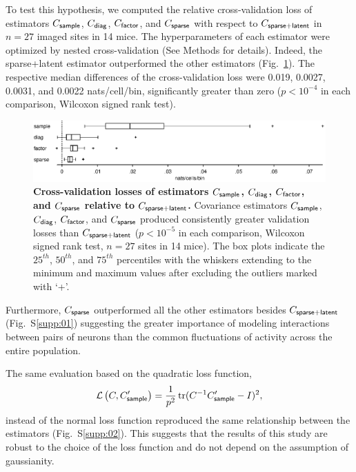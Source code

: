 \documentclass[10pt]{article}
\DeclareMathOperator{\Tr}{tr}
\newcommand{\loss}[1]{\mathcal L\left(#1\right)}
\begin{document}
To test this hypothesis, we computed the relative cross-validation loss of estimators  $C_{\sf sample}$, $C_{\sf diag}$, $C_{\sf factor}$, and $C_{\sf sparse}$ with respect to $C_{\sf sparse+latent}$ in $n=27$ imaged sites in 14 mice.  The hyperparameters of each estimator were optimized by nested cross-validation (See Methods for details). Indeed, the sparse+latent estimator outperformed the other estimators (Fig.~\ref{fig:3}). The respective median differences of the cross-validation loss were 0.019, 0.0027, 0.0031, and 0.0022 nats/cell/bin, significantly greater than zero ($p<10^{-4}$ in each comparison, Wilcoxon signed rank test).  

\begin{figure}[!ht]
    \begin{center}
    \includegraphics{./figures/src/Fig3.eps}
    \end{center}
    \caption{
    {\bf Cross-validation losses of estimators $C_{\sf sample}$, $C_{\sf diag}$, $C_{\sf factor}$, and $C_{\sf sparse}$ relative to $C_{\sf sparse+latent}$.}
    Covariance estimators $C_{\sf sample}$, $C_{\sf diag}$, $C_{\sf factor}$, and $C_{\sf sparse}$ produced consistently greater validation losses than $C_{\sf sparse+latent}$ ($p<10^{-5}$ in each comparison, Wilcoxon signed rank test, $n=27$ sites in 14 mice). The box plots indicate the $25^{th}$, $50^{th}$, and $75^{th}$ percentiles with the whiskers extending to the minimum and maximum values after excluding the outliers marked with `+'. 
} \label{fig:3}
\end{figure}

Furthermore, $C_{\sf sparse}$ outperformed all the other estimators besides $C_{\sf sparse+latent}$ (Fig.~S\ref{supp:01}) suggesting the greater importance of modeling interactions between pairs of neurons than the common fluctuations of activity across the entire population.

The same evaluation based on the quadratic loss function,
\begin{equation}\label{eq:quadratic}
\loss{C,C_{\sf sample}^\prime}=\frac 1 {p^2}\Tr(C^{-1}C_{\sf sample}^\prime-I)^2,
\end{equation}
instead of the normal loss function reproduced the same relationship between the estimators (Fig.~S\ref{supp:02}). This suggests that the results of this study are robust to the choice of the loss function and do not depend on the assumption of gaussianity. 
\end{document}
